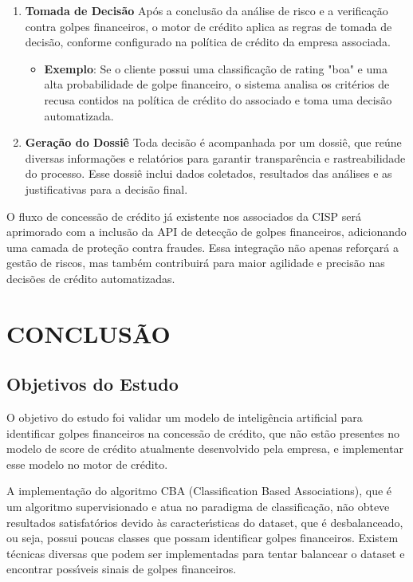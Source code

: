 \documentclass[12pt,a4paper]{article}
\begin{document}
\begin{enumerate}
    \item \textbf{Tomada de Decis\~{a}o}
    Ap\'os a conclus\~{a}o da an\'alise de risco e a verifica\c{c}\~{a}o contra golpes financeiros, o motor de cr\'edito aplica as regras de tomada de decis\~{a}o, conforme configurado na pol\'itica de cr\'edito da empresa associada.
    \begin{itemize}
        \item \textbf{Exemplo}: Se o cliente possui uma classifica\c{c}\~{a}o de rating "boa" e uma alta probabilidade de golpe financeiro, o sistema analisa os crit\'erios de recusa contidos na pol\'itica de cr\'edito do associado e toma uma decis\~{a}o automatizada.
    \end{itemize}

    \item \textbf{Gera\c{c}\~{a}o do Dossi\^e}
    Toda decis\~{a}o \'{e} acompanhada por um dossi\^e, que re\'une diversas informa\c{c}\~{o}es e relat\'orios para garantir transpar\^{e}ncia e rastreabilidade do processo. Esse dossi\^e inclui dados coletados, resultados das an\'alises e as justificativas para a decis\~{a}o final.
\end{enumerate}

O fluxo de concess\~{a}o de cr\'edito j\'a existente nos associados da CISP ser\'a aprimorado com a inclus\~{a}o da API de detec\c{c}\~{a}o de golpes financeiros, adicionando uma camada de prote\c{c}\~{a}o contra fraudes. Essa integra\c{c}\~{a}o n\~{a}o apenas refor\c{c}ar\'a a gest\~{a}o de riscos, mas tamb\'em contribuir\'a para maior agilidade e precis\~{a}o nas decis\~{o}es de cr\'edito automatizadas.



\section{CONCLUSÃO}
\subsection{Objetivos do Estudo}

O objetivo do estudo foi validar um modelo de intelig\^{e}ncia artificial para identificar golpes financeiros na concess\~{a}o de cr\'edito, que n\~{a}o est\~{a}o presentes no modelo de score de cr\'edito atualmente desenvolvido pela empresa, e implementar esse modelo no motor de cr\'edito. 

A implementa\c{c}\~{a}o do algoritmo CBA (Classification Based Associations), que \'{e} um algoritmo supervisionado e atua no paradigma de classifica\c{c}\~{a}o, n\~{a}o obteve resultados satisfat\'orios devido \`as caracter\'{\i}sticas do dataset, que \'{e} desbalanceado, ou seja, possui poucas classes que possam identificar golpes financeiros. Existem t\'ecnicas diversas que podem ser implementadas para tentar balancear o dataset e encontrar poss\'{\i}veis sinais de golpes financeiros. 
\end{document}
